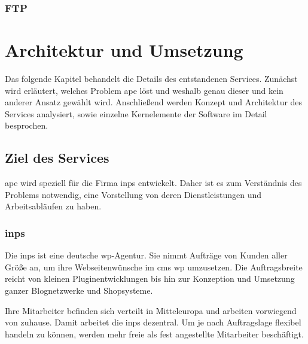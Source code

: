 
\subsubsection{FTP} %
\label{ssub:ftp}




\section{Architektur und Umsetzung} %
\label{sec:architektur_und_umsetzung}

Das folgende Kapitel behandelt die Details des entstandenen Services. Zunächst wird erläutert, welches Problem \gls{ape} löst und weshalb genau dieser und kein anderer Ansatz gewählt wird. Anschließend werden Konzept und Architektur des Services analysiert, sowie einzelne Kernelemente der Software im Detail besprochen.

\subsection{Ziel des Services} %
\label{sub:ziel_des_services}

\gls{ape} wird speziell für die Firma \gls{inps} entwickelt. Daher ist es zum Verständnis des Problems notwendig, eine Vorstellung von deren Dienstleistungen und Arbeitsabläufen zu haben.

\subsubsection{\gls{inps}} %
\label{ssub:inps}


Die \gls{inps} ist eine deutsche \gls{wp}-Agentur. Sie nimmt Aufträge von Kunden aller Größe an, um ihre Webseitenwünsche im \gls{cms} \gls{wp} umzusetzen. Die Auftragsbreite reicht von kleinen Pluginentwicklungen bis hin zur Konzeption und Umsetzung ganzer Blognetzwerke und Shopsysteme.

Ihre Mitarbeiter befinden sich verteilt in Mitteleuropa und arbeiten vorwiegend von zuhause. Damit arbeitet die \gls{inps} dezentral. Um je nach Auftragslage flexibel handeln zu können, werden mehr freie als fest angestellte Mitarbeiter beschäftigt.

